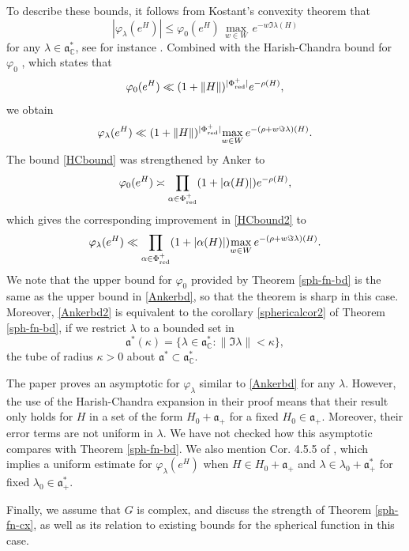 \documentclass[12pt]{amsart}
\theoremstyle{remark}
\newcommand{\C}{\mathbb C}
\newcommand{\ga}{\mathfrak a}
\newcommand{\be}{\begin{equation}}
\newcommand{\ee}{\end{equation}}
\begin{document}
To describe these bounds, it follows from Kostant's convexity theorem that
\[
|\varphi_\lambda(e^H)| \le \varphi_0(e^H) \, \underset{w \in W}{\max} \, e^{-w \Im \lambda(H) }
\]
for any $\lambda \in \ga^*_\C$, see for instance \cite[Prop 4.6.1]{Gangolli_Varadarajan_88}.  Combined with the Harish-Chandra bound for $\varphi_0$ \cite[Theorem 4.6.4]{Gangolli_Varadarajan_88}, which states that
\be
\label{HCbound}
\varphi_0(e^H) \ll (1 + \| H \|)^{ |\Phi_\textnormal{red}^+| } e^{-\rho(H)},
\ee
we obtain
\be
\label{HCbound2}
\varphi_\lambda(e^H) \ll (1 + \| H \|)^{ |\Phi_\textnormal{red}^+| } \underset{w \in W}{\max} \, e^{-(\rho + w \Im \lambda)(H) }.
\ee
The bound \eqref{HCbound} was strengthened by Anker \cite{Anker_87} to
\be
\label{Ankerbd}
\varphi_0(e^H) \asymp \prod_{\alpha \in \Phi_\textnormal{red}^+} (1 + |\alpha(H)|) e^{-\rho(H)},
\ee
which gives the corresponding improvement in \eqref{HCbound2} to
\be
\label{Ankerbd2}
\varphi_\lambda(e^H) \ll \prod_{\alpha \in \Phi_\textnormal{red}^+} (1 + |\alpha(H)|) \underset{w \in W}{\max} \, e^{-(\rho + w \Im \lambda)(H) }.
\ee
We note that the upper bound for $\varphi_0$ provided by Theorem \ref{sph-fn-bd} is the same as the upper bound in \eqref{Ankerbd}, so that the theorem is sharp in this case.  Moreover, \eqref{Ankerbd2} is equivalent to the corollary \eqref{sphericalcor2} of Theorem \ref{sph-fn-bd}, if we restrict $\lambda$ to a bounded set in
\begin{equation}\label{temp-tube}
\ga^*(\kappa)=\{ \lambda \in \ga^*_\C : \| \Im \lambda \| < \kappa \},
\end{equation} 
 the tube of radius $\kappa>0$ about $\ga^*\subset\ga_\C^*$.
\medskip

The paper \cite{Narayanan_Pasquale_Pusti_14} proves an asymptotic for $\varphi_\lambda$ similar to \eqref{Ankerbd} for any $\lambda$. However, the use of the Harish-Chandra expansion in their proof means that their result only holds for $H$ in a set of the form $H_0 + \ga_+$ for a fixed $H_0 \in \ga_+$.  Moreover, their error terms are not uniform in $\lambda$. We have not checked how this asymptotic compares with Theorem \ref{sph-fn-bd}. We also mention Cor. 4.5.5 of \cite{Gangolli_Varadarajan_88}, which implies a uniform estimate for $\varphi_\lambda(e^H)$ when $H \in H_0 + \ga_+$ and $\lambda \in \lambda_0 + \ga^{*}_+$ for fixed $\lambda_0 \in \ga^{*}_+$.
\medskip

Finally, we assume that $G$ is complex, and discuss the strength of Theorem \ref{sph-fn-cx}, as well as its relation to existing bounds for the spherical function in this case.  
\end{document}
